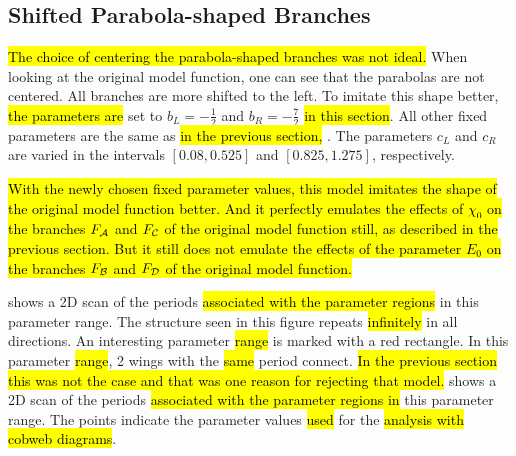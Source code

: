 \subsection{Shifted Parabola-shaped Branches}
\label{sec:setup.quad.skewed}

\hl{
	The choice of centering the parabola-shaped branches was not ideal.
}
When looking at the original model function, one can see that the parabolas are not centered.
All branches are more shifted to the left.
To imitate this shape better, \hl{the parameters are} set to $b_L = -\frac{1}{2}$ and $b_R = -\frac{7}{2}$ \hl{in this section}.
All other fixed parameters are the same as \hl{in the previous section,} .
The parameters $c_L$ and $c_R$ are varied in the intervals $[0.08, 0.525]$ and $[0.825, 1.275]$, respectively.

\hl{
	With the newly chosen fixed parameter values, this model imitates the shape of the original model function better.
	And it perfectly emulates the effects of $\chi_0$ on the branches $F_{\mathcal{A}}$ and $F_{\mathcal{C}}$ of the original model function still, as described in the previous section.
	But it still does not emulate the effects of the parameter $E_0$ on the branches $F_{\mathcal{B}}$ and $F_{\mathcal{D}}$ of the original model function.
}

 shows a 2D scan of the periods \hl{associated with the parameter regions} in this parameter range.
The structure seen in this figure repeats \hl{infinitely} in all directions.
An interesting parameter \hl{range} is marked with a red rectangle.
In this parameter \hl{range}, 2 wings with the \hl{same} period connect.
\hl{
	In the previous section this was not the case and that was one reason for rejecting that model.
}
 shows a 2D scan of the periods \hl{associated with the parameter regions in} this parameter range.
The points indicate the parameter values \hl{used} for the \hl{analysis with cobweb diagrams}.

